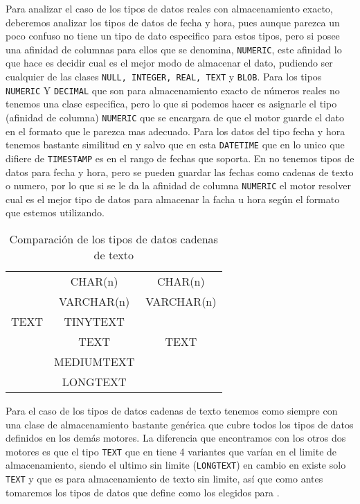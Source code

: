 %
Para analizar el caso de los tipos de datos reales con almacenamiento exacto, deberemos analizar los tipos de datos de fecha y hora, pues aunque parezca un poco confuso \s no tiene un tipo de dato especifico para estos tipos, pero si posee una afinidad de columnas para ellos que se denomina, \verb=NUMERIC=, este afinidad lo que hace es decidir cual es el mejor modo de almacenar el dato, pudiendo ser cualquier de las clases \verb=NULL, INTEGER, REAL, TEXT= y \verb=BLOB=. Para los tipos \verb=NUMERIC= Y \verb=DECIMAL= que son para almacenamiento exacto de números reales no tenemos una clase especifica, pero lo que si podemos hacer es asignarle el tipo (afinidad de columna) \verb=NUMERIC= que se encargara de que el motor guarde el dato en el formato que le parezca mas adecuado. Para los datos del tipo fecha y hora tenemos bastante similitud  en \m y \p salvo que en \m esta \verb=DATETIME= que en lo unico que difiere de \verb=TIMESTAMP= es en el rango de fechas que soporta. En \s no tenemos tipos de datos para fecha y hora, pero se pueden guardar las fechas como cadenas de texto o numero, por lo que si se le da la afinidad de columna \verb=NUMERIC= el motor resolver cual es el mejor tipo de datos para almacenar la facha u hora según el formato que estemos utilizando.   
%
\begin{table}[h]
\begin{center}
\begin{tabular}{|c|c|c|}
\hline \s & \m & \p \\ 
\hline  & CHAR(n) & CHAR(n) \\  
    & VARCHAR(n) & VARCHAR(n) \\ 
  TEXT   & TINYTEXT &  \\  
    & TEXT & TEXT \\
    & MEDIUMTEXT &  \\  
    & LONGTEXT &  \\  
\hline 
\end{tabular} 
\end{center}
\caption{Comparación de los tipos de datos cadenas de texto}
\end{table}
%
Para el caso de los tipos de datos cadenas de texto tenemos como siempre \s con una clase de almacenamiento bastante genérica que cubre todos los tipos de datos definidos en los demás motores. La diferencia que encontramos con los otros dos motores es que el tipo \verb=TEXT= que en \m tiene 4 variantes que varían en el limite de almacenamiento, siendo el ultimo sin limite (\verb=LONGTEXT=) en cambio en \p existe solo \verb=TEXT= y que es para almacenamiento de texto sin limite, así que como antes tomaremos los tipos de datos que define \p como los elegidos para \cc. 
